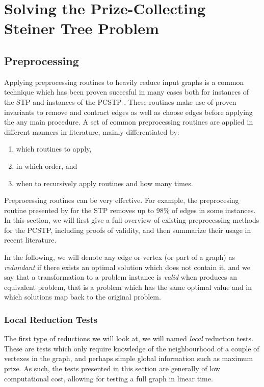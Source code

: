 \chapter{Solving the Prize-Collecting Steiner Tree Problem}
\label{chap:solving}
\section{Preprocessing}
Applying preprocessing routines to heavily reduce input graphs is a common technique which has been proven succesful in many cases both for instances of the STP
\citep{koch1998solving}
and instances of the PCSTP
\citep{ljubic2005solving, gamrath2017scip}. %
These routines make use of proven invariants to remove and contract edges as well as choose edges before applying the any main procedure.
A set of common preprocessing routines are applied in different manners in literature, mainly differentiated by:
\begin{enumerate}[label=\alph*)]
\item which routines to apply,
\item in which order, and
\item when to recursively apply routines and how many times.
\end{enumerate}
Preprocessing routines can be very effective. For example, the preprocesing routine presented by \cite{koch1998solving} for the STP removes
up to 98\% of edges in some instances. In this section, we will first give a full overview of existing preprocessing methods for the PCSTP,
 including proofs of validity,
 and then summarize their usage in recent literature.

 In the following, we will denote any edge or vertex (or part of a graph) as \textit{redundant} if there exists an optimal solution
  which does not contain it, and we say that a 
  transformation to a problem instance is \textit{valid} when produces an equivalent problem, that is a problem which has the same optimal
  value and in which solutions map back to the original problem.

 \subsection{Local Reduction Tests}
 The first type of reductions we will look at, we will named \textit{local} reduction tests. These are tests which only require knowledge
 of the neighbourhood of a couple of vertexes in the graph, and perhaps simple global information such as maximum prize. As such, the tests
 presented in this section are generally of low computational cost, allowing for testing a full graph in linear time.


